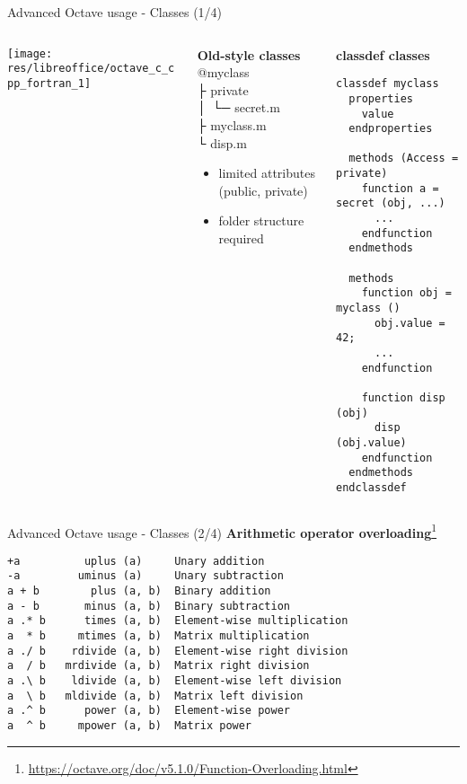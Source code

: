 \begin{frame}[t,fragile]{Advanced Octave usage - Classes (1/4)}
\begin{columns}
\begin{column}[t]{0.3\textwidth}
\texttt{[image: res/libreoffice/octave\_c\_cpp\_fortran\_1]}
\end{column}
\begin{column}{0.3\textwidth}
\textbf{Old-style classes}\\[1em]

{\ttfamily\scriptsize
\colorbox{orange!30}{@myclass} \\
├ \colorbox{orange!30}{private} \\
│ └─ secret.m \\
├ myclass.m   \\
└ disp.m} \\[1em]

\begin{itemize}
\item
limited attributes (public, private)

\item
folder structure required
\end{itemize}
\end{column}
\begin{column}{0.3\textwidth}
\textbf{classdef classes}
\begin{lstlisting}
classdef myclass
  properties
    value
  endproperties

  methods (Access = private)
    function a = secret (obj, ...)
      ...
    endfunction
  endmethods

  methods
    function obj = myclass ()
      obj.value = 42;
      ...
    endfunction

    function disp (obj)
      disp (obj.value)
    endfunction
  endmethods
endclassdef
\end{lstlisting}
\end{column}
\end{columns}
\end{frame}


\begin{frame}[fragile]{Advanced Octave usage - Classes (2/4)}
\textbf{Arithmetic operator overloading}\footnote{\url{https://octave.org/doc/v5.1.0/Function-Overloading.html}}

\begin{lstlisting}[basicstyle=\normalfont,xleftmargin=4em]
+a          uplus (a)     Unary addition
-a         uminus (a)     Unary subtraction
a + b        plus (a, b)  Binary addition
a - b       minus (a, b)  Binary subtraction
a .* b      times (a, b)  Element-wise multiplication
a  * b     mtimes (a, b)  Matrix multiplication
a ./ b    rdivide (a, b)  Element-wise right division
a  / b   mrdivide (a, b)  Matrix right division
a .\ b    ldivide (a, b)  Element-wise left division
a  \ b   mldivide (a, b)  Matrix left division
a .^ b      power (a, b)  Element-wise power
a  ^ b     mpower (a, b)  Matrix power
\end{lstlisting}
\end{frame}


